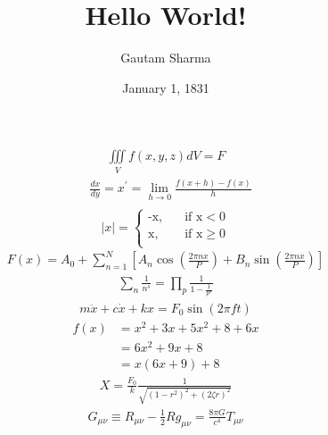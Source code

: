 \documentclass{article}
\title{Hello World!}
\author{Gautam Sharma}
\date{January 1, 1831}
\begin{document}
\begin{gather*}
    \iiint \limits_V f(x, y, z)dV = F
\end{gather*}
\begin{align*}
    & \frac{dx}{dy} = x^{'} = \lim_{h \to 0} \frac{f(x+h)-f(x)}{h}\\
\end{align*}
\[
|x| = 
     \begin{cases}
       \text{-x,} &\quad\text{if x}<0\\
       \text{x,} &\quad\text{if x}\ge0 \\
     \end{cases}
\]
\begin{align*}
F(x) = A_0 +  \sum_{n=1}^{N} \left[  A_n\cos\left({\frac{2\pi nx}{P}}\right) +B_n\sin\left({\frac{2\pi nx}{P}}\right) \right] 
\end{align*}
\begin{align*}
     \sum_{n} \frac{1}{n^s} = \prod_{p} \frac{1}{1-\frac{1}{p^s}}
\end{align*}
\begin{align*}
     m\ddot{x}+c\dot{x}+kx = F_0\sin{(2\pi ft)}
\end{align*}
\begin{align*}
f(x) &= x^2 + 3x + 5x^2 + 8 + 6x\\
     &= 6x^2 + 9x + 8\\
     &= x(6x+9) + 8
\end{align*}
\begin{align*}
X = {\frac{F_0}{k}}{\frac{1}{\sqrt{(1-r^2)^2 + (2\zeta r)^2}}}
\end{align*}
\begin{align*}
G_{\mu\nu} \equiv R_{\mu\nu} - {\frac{1}{2}}{R}{g_{\mu\nu}} = {\frac{8\pi G}{c^4}}{T_{\mu\nu}}\\
\end{align*}
\end{document}
